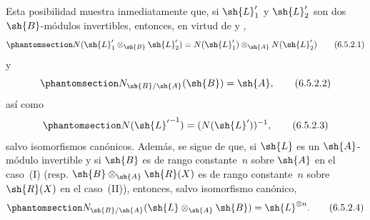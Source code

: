 \documentclass[oneside,10pt]{amsart}
\let\EGAOriginalLabel\label
\renewcommand{\label}[1]{\phantomsection\EGAOriginalLabel{#1}}
\begin{document}
\begin{env}[6.5.2]
Esta posibilidad muestra inmediatamente que, si $\sh{L}'_1$ y $\sh{L}'_2$ son dos $\sh{B}$-módulos invertibles, entonces, en virtud de  y ,
\[
\label{II.6.5.2.1}
  N(\sh{L}'_1\otimes_{\sh{B}}\sh{L}'_2) = N(\sh{L}'_1)\otimes_{\sh{A}}N(\sh{L}'_2)
\tag{6.5.2.1}
\]
y
\[
\label{II.6.5.2.2}
  N_{\sh{B}/\sh{A}}(\sh{B}) = \sh{A},
\tag{6.5.2.2}
\]
así como
\[
\label{II.6.5.2.3}
  N({\sh{L}'}^{-1}) = (N(\sh{L}'))^{-1},
\tag{6.5.2.3}
\]
salvo isomorfismos canónicos.
Además, se sigue de  que, si $\sh{L}$ es un $\sh{A}$-módulo invertible y si $\sh{B}$ es de rango constante~$n$ sobre $\sh{A}$ en el caso~(I) (resp. $\sh{B}\otimes_{\sh{A}}\sh{R}(X)$ es de rango constante~$n$ sobre $\sh{R}(X)$ en el caso~(II)), entonces, salvo isomorfismo canónico,
\[
\label{II.6.5.2.4}
  N_{\sh{B}/\sh{A}}(\sh{L}\otimes_{\sh{A}}\sh{B}) = \sh{L}^{\otimes n}.
\tag{6.5.2.4}
\]
\end{env}
\end{document}
